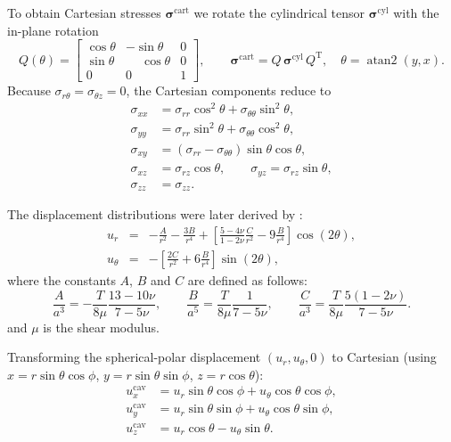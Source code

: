 \documentclass[sn-mathphys,Numbered]{sn-jnl}%
\begin{document}
\begin{appendices}
To obtain Cartesian stresses \(\boldsymbol{\sigma}^{\mathrm{cart}}\) we rotate the cylindrical tensor
\(\boldsymbol{\sigma}^{\mathrm{cyl}}\) with the in-plane rotation
\[
Q(\theta)=
\begin{bmatrix}
\cos\theta & -\sin\theta & 0\\
\sin\theta & \phantom{-}\cos\theta & 0\\
0 & 0 & 1
\end{bmatrix},\qquad
\boldsymbol{\sigma}^{\mathrm{cart}} = Q\,\boldsymbol{\sigma}^{\mathrm{cyl}}\,Q^{\text{T}},\quad
\theta=\operatorname{atan2}(y,x).
\]
Because \(\sigma_{r\theta}=\sigma_{\theta z}=0\), the Cartesian components reduce to
\[
\begin{aligned}
\sigma_{xx} &= \sigma_{rr}\cos^2\theta + \sigma_{\theta\theta}\sin^2\theta,\\
\sigma_{yy} &= \sigma_{rr}\sin^2\theta + \sigma_{\theta\theta}\cos^2\theta,\\
\sigma_{xy} &= (\sigma_{rr}-\sigma_{\theta\theta})\sin\theta\cos\theta,\\
\sigma_{xz} &= \sigma_{rz}\cos\theta,\qquad
\sigma_{yz} = \sigma_{rz}\sin\theta,\\
\sigma_{zz} &= \sigma_{zz}.
\end{aligned}
\]

The displacement distributions were later derived by \citet{Goodier1933}:
\begin{eqnarray}
u_r &=& -\frac{A}{r^2} - \frac{3B}{r^4} + \left[ \frac{5-4\nu}{1-2\nu} \frac{C}{r^2}-9\frac{B}{r^4} \right]\cos (2\theta),\\
u_{\theta} &=& - \left[ \frac{2C}{r^2} + 6\frac{B}{r^4}  \right]\sin(2\theta),
\end{eqnarray}
where the constants $A$, $B$ and $C$ are defined as follows:
\begin{equation}
\frac{A}{a^3} = -\frac{T}{8\mu}\frac{13-10\nu}{7-5\nu}, \qquad
\frac{B}{a^5} = \frac{T}{8\mu}\frac{1}{7-5\nu}, \qquad
\frac{C}{a^3} = \frac{T}{8\mu}\frac{5(1-2\nu)}{7-5\nu}.
\end{equation}
and $\mu$ is the shear modulus.

Transforming the spherical-polar displacement \((u_r,u_\theta,0)\) to Cartesian
(using \(x=r\sin\theta\cos\phi\), \(y=r\sin\theta\sin\phi\), \(z=r\cos\theta\)):
\begin{align}
u_x^{\text{cav}} &= u_r\sin\theta\cos\phi + u_\theta\cos\theta\cos\phi,\\
u_y^{\text{cav}} &= u_r\sin\theta\sin\phi + u_\theta\cos\theta\sin\phi,\\
u_z^{\text{cav}} &= u_r\cos\theta - u_\theta\sin\theta.
\end{align}


\end{appendices}
\end{document}
